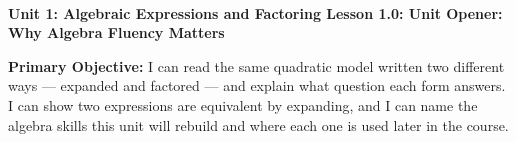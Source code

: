\documentclass[10pt]{article}
\newcommand{\UnitNumberName}{Unit 1: Algebraic Expressions and Factoring \quad}
\newcommand{\LessonNumberName}{Lesson 1.0: Unit Opener: Why Algebra Fluency Matters}
\begin{document}
\begin{center}
    {\Large\bfseries \CourseName \\
    {\small\bfseries \UnitNumberName \LessonNumberName}}
\end{center}

\begin{tcolorbox}[colback=mist, colframe=royal, boxrule=0.9pt, arc=2mm,
    left=2mm, right=2mm, top=1.5mm, bottom=1.5mm]
    \textbf{Primary Objective:} I can read the same quadratic model written two different ways
    --- expanded and factored --- and explain what question each form answers. I can show two
    expressions are equivalent by expanding, and I can name the algebra skills this unit will
    rebuild and where each one is used later in the course.
\end{tcolorbox}
\end{document}
